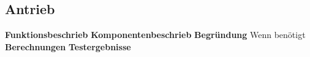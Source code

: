 \subsection{Antrieb}

\textbf{Funktionsbeschrieb}
\textbf{Komponentenbeschrieb}
\textbf{Begründung}
Wenn benötigt
\textbf{Berechnungen}
\textbf{Testergebnisse}